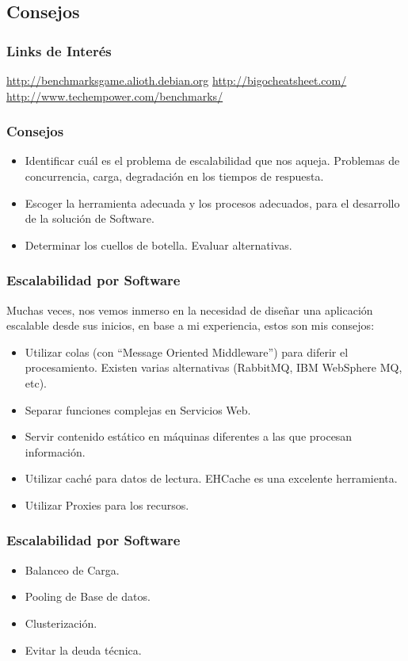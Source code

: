 \documentclass[12pt]{beamer}
\begin{document}
\subsection{Consejos}

\begin{frame}
 \frametitle{Links de Interés}
 \href{http://benchmarksgame.alioth.debian.org}{http://benchmarksgame.alioth.debian.org}
 \newline
 \href{http://bigocheatsheet.com/}{http://bigocheatsheet.com/}
 \newline
 \href{http://www.techempower.com/benchmarks/}{http://www.techempower.com/benchmarks/}
\end{frame}


\begin{frame}
 \frametitle{Consejos}
 \begin{itemize}
  \item<2-> Identificar cuál es el problema de escalabilidad que nos aqueja. Problemas de concurrencia, carga, degradación en los tiempos de respuesta.
  \item<3-> Escoger la herramienta adecuada y los procesos adecuados, para el desarrollo de la solución de Software.
  \item<4-> Determinar los cuellos de botella. Evaluar alternativas.
 \end{itemize}
\end{frame}


\begin{frame}
 \frametitle{Escalabilidad por Software}
 Muchas veces, nos vemos inmerso en la necesidad de diseñar una aplicación escalable desde sus inicios, en base a mi experiencia, estos son mis consejos:
 \begin{itemize}
  \item<2-> Utilizar colas (con ``Message Oriented Middleware'') para diferir el procesamiento. Existen varias alternativas (RabbitMQ, IBM WebSphere MQ, etc).
  \item<3-> Separar funciones complejas en Servicios Web.
  \item<4-> Servir contenido estático en máquinas diferentes a las que procesan información.
  \item<5-> Utilizar caché para datos de lectura. EHCache es una excelente herramienta.
  \item<6-> Utilizar Proxies para los recursos.
 \end{itemize}
\end{frame}
 
\begin{frame}
 \frametitle{Escalabilidad por Software}
 \begin{itemize}
  \item<2-> Balanceo de Carga.
  \item<3-> Pooling de Base de datos. 
  \item<4-> Clusterización.
  \item<5-> Evitar la deuda técnica.
\end{itemize}
\end{frame}
\end{document}
